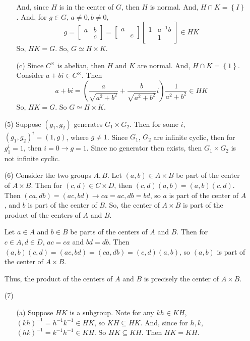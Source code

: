 \begin{itemize}
\begin{itemize}
And, since $H$ is in the center of $G$, then $H$ is normal. And, $H \cap K = \left\lbrace I \right\rbrace$. And, for $g \in G$, $a \neq 0, b \neq 0$,
$$g = \begin{bmatrix}
a & b \\
& c
\end{bmatrix} = \begin{bmatrix}
a \\
& c
\end{bmatrix}\begin{bmatrix}
1 & a^{-1}b\\
& 1
\end{bmatrix} \in HK$$
So, $HK = G$. So, $G \simeq H \times K$.
\item[(c)]
Since $C^\times$ is abelian, then $H$ and $K$ are normal. And, $H \cap K = \left\lbrace 1 \right\rbrace$. Consider $a + bi \in C^\times$. Then 
$$a + bi = \left(\frac{a}{\sqrt{a^2+b^2}} + \frac{b}{\sqrt{a^2+b^2}}i\right)\frac{1}{a^2+b^2} \in HK$$
So, $HK = G$. So $G \simeq H \times K$.
\end{itemize}
\item[(5)]
Suppose $(g_1, g_2)$ generates $G_1 \times G_2$. Then for some $i$, $(g_1, g_2)^i = (1, g)$, where $g \neq 1$. Since $G_1$, $G_2$ are infinite cyclic, then for $g_1^i = 1$, then $i = 0 \rightarrow g = 1$. Since no generator then exists, then $G_1 \times G_2$ is not infinite cyclic.
\item[(6)]
Consider the two groups $A, B$. Let $(a, b) \in A \times B$ be part of the center of $A \times B$. Then for $(c, d) \in C \times D$, then $(c, d)(a, b) = (a, b)(c, d)$. Then $(ca, db) = (ac, bd) \rightarrow ca = ac, db = bd$, so $a$ is part of the center of $A$, and $b$ is part of the center of $B$. So, the center of $A \times B$ is part of the product of the centers of $A$ and $B$.

Let $a \in A$ and $b \in B$ be parts of the centers of $A$ and $B$. Then for $c \in A, d \in D$, $ac = ca$ and $bd = db$. Then $(a, b)(c, d) = (ac, bd) = (ca, db) = (c, d)(a, b)$, so $(a, b)$ is part of the center of $A \times B$.

Thus, the product of the centers of $A$ and $B$ is precisely the center of $A \times B$.
\item[(7)]
\begin{itemize}
\item[(a)]
Suppose $HK$ is a subgroup. Note for any $kh \in KH$, $(kh)^{-1} = h^{-1}k^{-1} \in HK$, so $KH \subseteq HK$. And, since for $h, k$, $(hk)^{-1} = k^{-1}h^{-1} \in KH$. So $HK \subseteq KH$. Then $HK = KH$.


\end{itemize}
\end{itemize}
